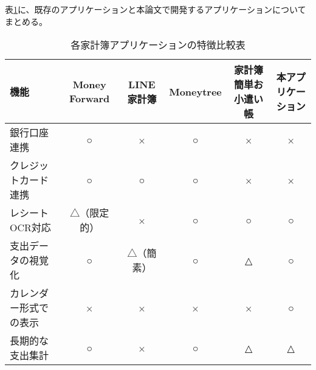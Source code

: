 \documentclass[main]{subfiles}
\begin{document}
表\ref{tab:featureComparisonKakeibo}に、既存のアプリケーションと本論文で開発するアプリケーションについてまとめる。





\begin{table}[tbp]
    \centering
    \caption{各家計簿アプリケーションの特徴比較表}
    \label{tab:featureComparisonKakeibo}
    \small
    \begin{tabular}{|l|c|c|c|c|c|}
        \hline
        \textbf{機能} & \textbf{Money Forward} & \textbf{LINE家計簿} & \textbf{Moneytree} & \textbf{家計簿 簡単お小遣い帳} & \textbf{本アプリケーション} \\
        \hline
        銀行口座連携 & ○ & × & ○ & × & × \\
        \hline
        クレジットカード連携 & ○ & ○ & ○ & × & × \\
        \hline
        レシートOCR対応 & △（限定的） & × & ○ & ○ & ○ \\
        \hline
        支出データの視覚化 & ○ & △（簡素） & ○ & △ & ○ \\
        \hline
        カレンダー形式での表示 & × & × & × & × & ○ \\
        \hline
        長期的な支出集計 & ○ & × & ○ & △ & △ \\
        \hline
    \end{tabular}
\end{table}
\end{document}
